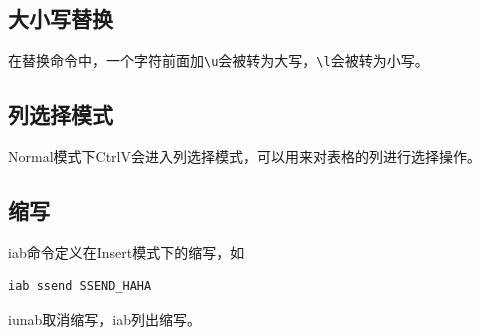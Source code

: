\subsection{大小写替换}
在替换命令中，一个字符前面加\verb+\u+会被转为大写，\verb+\l+会被转为小写。


\subsection{列选择模式}
Normal模式下CtrlV会进入列选择模式，可以用来对表格的列进行选择操作。


\subsection{缩写}
iab命令定义在Insert模式下的缩写，如

\begin{verbatim}
iab ssend SSEND_HAHA
\end{verbatim}
iunab取消缩写，iab列出缩写。

